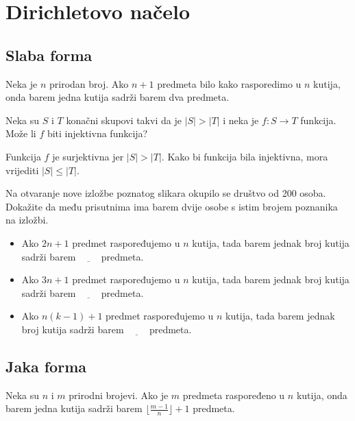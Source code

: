 \section{Dirichletovo načelo}

\subsection{Slaba forma}

\begin{theorem}
    Neka je $n$ prirodan broj. Ako $n+1$ predmeta bilo kako rasporedimo u $n$
    kutija, onda barem jedna kutija sadrži barem dva predmeta.
\end{theorem}

\begin{problem}
    Neka su $S$ i $T$ konačni skupovi takvi da je $|S| > |T|$ i neka je $f:S\to
    T$ funkcija. Može li $f$ biti injektivna funkcija?
\end{problem}

Funkcija $f$ je surjektivna jer $|S| > |T|$. Kako bi funkcija bila injektivna,
mora vrijediti $|S| \leq |T|$.

\begin{problem}
    Na otvaranje nove izložbe poznatog slikara okupilo se društvo od 200 osoba.
    Dokažite da među prisutnima ima barem dvije osobe s istim brojem poznanika
    na izložbi.
\end{problem}

\begin{problem}
    \begin{itemize}
        \item Ako $2n+1$ predmet raspoređujemo u $n$ kutija, tada barem jednak
        broj kutija sadrži barem $\underline{\qquad}$ predmeta.
        \item Ako $3n+1$ predmet raspoređujemo u $n$ kutija, tada barem jednak
        broj kutija sadrži barem $\underline{\qquad}$ predmeta.
        \item Ako $n(k-1)+1$ predmet raspoređujemo u $n$ kutija, tada barem
        jednak broj kutija sadrži barem $\underline{\qquad}$ predmeta.
    \end{itemize}
\end{problem}

\subsection{Jaka forma}

\begin{problem}
    Neka su $n$ i $m$ prirodni brojevi. Ako je $m$ predmeta raspoređeno u $n$
    kutija, onda barem jedna kutija sadrži barem $\lfloor \frac{m-1}{n} \rfloor
    + 1$ predmeta.
\end{problem}

